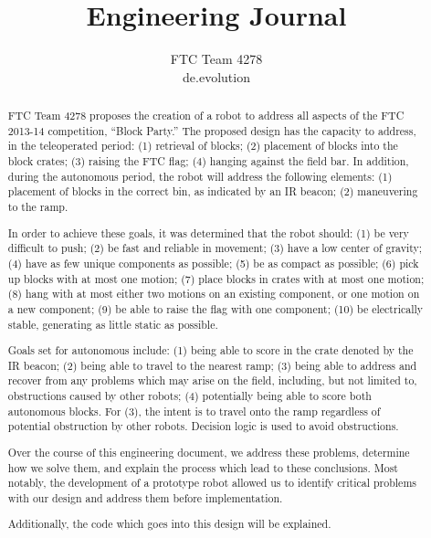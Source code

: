\documentclass{article}
\title{\textbf{Engineering Journal}}
\author{FTC Team 4278\\de.evolution}
\begin{document}
\maketitle

\begin{abstract}
FTC Team 4278 proposes the creation of a robot to address all aspects of the FTC 2013-14 competition, ``Block Party.'' The proposed design has the capacity to address, in the teleoperated period: (1) retrieval of blocks; (2) placement of blocks into the block crates; (3) raising the FTC flag; (4) hanging against the field bar. In addition, during the autonomous period, the robot will address the following elements: (1) placement of blocks in the correct bin, as indicated by an IR beacon; (2) maneuvering to the ramp. 

In order to achieve these goals, it was determined that the robot should: (1) be very difficult to push; (2) be fast and reliable in movement; (3) have a low center of gravity; (4) have as few unique components as possible; (5) be as compact as possible; (6) pick up blocks with at most one motion; (7) place blocks in crates with at most one motion; (8) hang with at most either two motions on an existing component, or one motion on a new component; (9) be able to raise the flag with one component; (10) be electrically stable, generating as little static as possible. 

Goals set for autonomous include: (1) being able to score in the crate denoted by the IR beacon; (2) being able to travel to the nearest ramp; (3) being able to address and recover from any problems which may arise on the field, including, but not limited to, obstructions caused by other robots; (4) potentially being able to score both autonomous blocks. For (3), the intent is to travel onto the ramp regardless of potential obstruction by other robots. Decision logic is used to avoid obstructions.

Over the course of this engineering document, we address these problems, determine how we solve them, and explain the process which lead to these conclusions. Most notably, the development of a prototype robot allowed us to identify critical problems with our design and address them before implementation.

Additionally, the code which goes into this design will be explained.
\end{abstract}\tableofcontents\newpage
\end{document}
